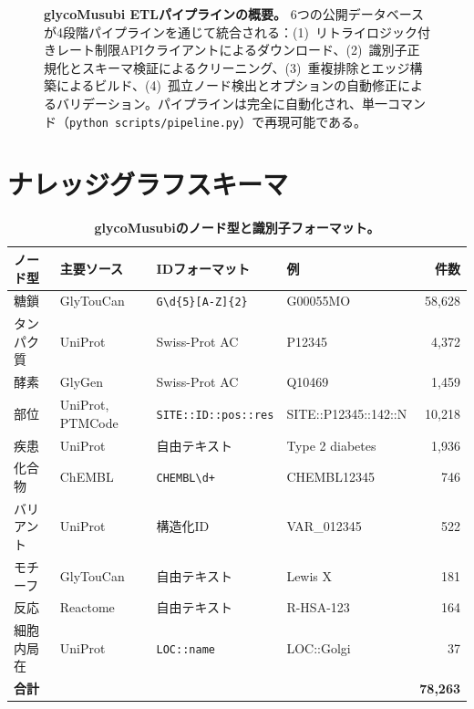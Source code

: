 \documentclass[11pt,a4paper]{ltjsarticle}
\begin{document}
\begin{figure}[H]
\caption{\textbf{glycoMusubi ETLパイプラインの概要。}
6つの公開データベースが4段階パイプラインを通じて統合される：(1)~リトライロジック付きレート制限APIクライアントによるダウンロード、(2)~識別子正規化とスキーマ検証によるクリーニング、(3)~重複排除とエッジ構築によるビルド、(4)~孤立ノード検出とオプションの自動修正によるバリデーション。パイプラインは完全に自動化され、単一コマンド（\texttt{python scripts/pipeline.py}）で再現可能である。}
\label{fig:etl_pipeline}
\end{figure}

\section{ナレッジグラフスキーマ}
\label{sec:schema}

\begin{table}[H]
\centering
\caption{\textbf{glycoMusubiのノード型と識別子フォーマット。}}
\label{tab:node_types}
\small
\begin{tabular}{llllr}
\toprule
\textbf{ノード型} & \textbf{主要ソース} & \textbf{IDフォーマット} & \textbf{例} & \textbf{件数} \\
\midrule
糖鎖    & GlyTouCan  & \texttt{G\textbackslash d\{5\}[A-Z]\{2\}} & G00055MO & 58,628 \\
タンパク質   & UniProt    & Swiss-Prot AC     & P12345   & 4,372 \\
酵素    & GlyGen     & Swiss-Prot AC     & Q10469   & 1,459 \\
部位      & UniProt, PTMCode & \texttt{SITE::ID::pos::res} & SITE::P12345::142::N & 10,218 \\
疾患   & UniProt    & 自由テキスト         & Type 2 diabetes & 1,936 \\
化合物  & ChEMBL     & \texttt{CHEMBL\textbackslash d+} & CHEMBL12345 & 746 \\
バリアント   & UniProt    & 構造化ID     & VAR\_012345 & 522 \\
モチーフ     & GlyTouCan  & 自由テキスト         & Lewis X   & 181 \\
反応  & Reactome   & 自由テキスト         & R-HSA-123 & 164 \\
細胞内局在 & UniProt & \texttt{LOC::name} & LOC::Golgi & 37 \\
\midrule
\multicolumn{4}{l}{\textbf{合計}} & \textbf{78,263} \\
\bottomrule
\end{tabular}
\end{table}
\end{document}
